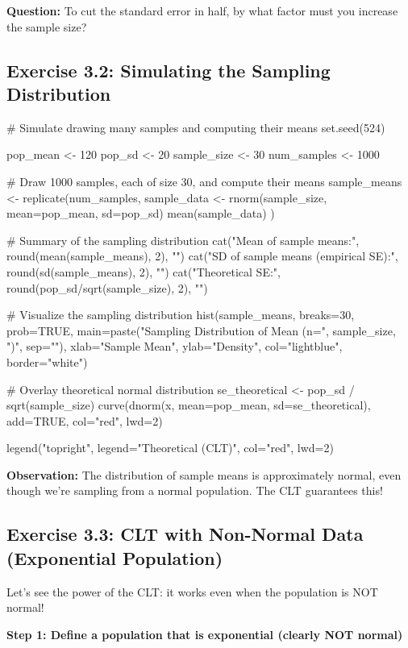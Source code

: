 \documentclass[11pt]{article}
\begin{document}
\textbf{Question:} To cut the standard error in half, by what factor must you increase the sample size?

\vspace{1.5cm}

\subsection{Exercise 3.2: Simulating the Sampling Distribution}

\begin{rcode}
# Simulate drawing many samples and computing their means
set.seed(524)

pop_mean <- 120
pop_sd <- 20
sample_size <- 30
num_samples <- 1000

# Draw 1000 samples, each of size 30, and compute their means
sample_means <- replicate(num_samples, {
  sample_data <- rnorm(sample_size, mean=pop_mean, sd=pop_sd)
  mean(sample_data)
})

# Summary of the sampling distribution
cat("Mean of sample means:", round(mean(sample_means), 2), "\n")
cat("SD of sample means (empirical SE):", round(sd(sample_means), 2), "\n")
cat("Theoretical SE:", round(pop_sd/sqrt(sample_size), 2), "\n")

# Visualize the sampling distribution
hist(sample_means, breaks=30, prob=TRUE,
     main=paste("Sampling Distribution of Mean (n=", sample_size, ")", sep=""),
     xlab="Sample Mean",
     ylab="Density",
     col="lightblue",
     border="white")

# Overlay theoretical normal distribution
se_theoretical <- pop_sd / sqrt(sample_size)
curve(dnorm(x, mean=pop_mean, sd=se_theoretical),
      add=TRUE, col="red", lwd=2)

legend("topright",
       legend="Theoretical (CLT)",
       col="red",
       lwd=2)
\end{rcode}

\textbf{Observation:} The distribution of sample means is approximately normal, even though we're sampling from a normal population. The CLT guarantees this!

\subsection{Exercise 3.3: CLT with Non-Normal Data (Exponential Population)}

Let's see the power of the CLT: it works even when the population is NOT normal!

\textbf{Step 1: Define a population that is exponential (clearly NOT normal)}
\end{document}
